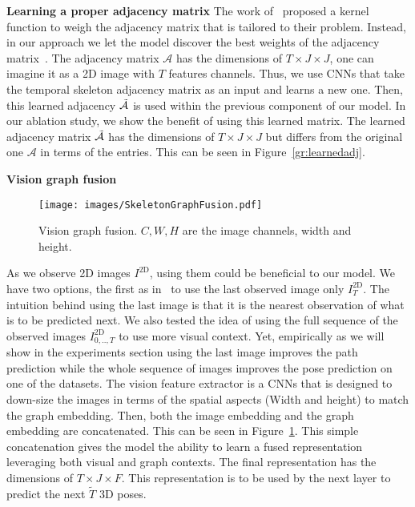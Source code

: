\documentclass[10pt,twocolumn,letterpaper]{article}
\begin{document}
\textbf{Learning a proper adjacency matrix}
The work of~\cite{mohamed2020social} proposed a kernel function to weigh the adjacency matrix that is tailored to their problem. Instead, in our approach we let the model discover the best weights of the adjacency matrix~\cite{wei2019motion}. The adjacency matrix $\mathcal{A}$ has the dimensions of $T \times J \times J$, one can imagine it as a 2D image with $T$ features channels. Thus, we use CNNs that take the temporal skeleton adjacency matrix as an input and learns a new one. Then, this learned adjacency $\mathcal{\Tilde{A}}$ is used within the previous component of our model. In our ablation study, we show the benefit of using this learned matrix. The learned adjacency matrix $\mathcal{\Tilde{A}}$ has the dimensions of $T \times J \times J$ but differs from the original one $\mathcal{A}$ in terms of the entries. This can be seen in Figure~\ref{gr:learnedadj}.

\textbf{Vision graph fusion}
\begin{figure}[t]
\begin{center}
\texttt{[image: images/SkeletonGraphFusion.pdf]}
\end{center}
   \caption{Vision graph fusion. $C, W, H$ are the image channels, width and height. }
\label{gr:fusion}
\end{figure}
As we observe 2D images $I^\text{2D}$, using them could be beneficial to our model. We have two options, the first as in~\cite{cao2020long} to use the last observed image only $I^\text{2D}_{T}$. The intuition behind using the last image is that it is the nearest observation of what is to be predicted next. We also tested the idea of using the full sequence of the observed images $I^\text{2D}_{0,..,T}$ to use more visual context. Yet, empirically as we will show in the experiments section using the last image improves the path prediction while the whole sequence of images improves the pose prediction on one of the datasets. The vision feature extractor is a CNNs that is designed to down-size the images in terms of the spatial aspects (Width and height) to match the graph embedding. Then, both the image embedding and the graph embedding are concatenated. This can be seen in Figure~\ref{gr:fusion}. This simple concatenation gives the model the ability to learn a fused representation leveraging both visual and graph contexts. The final representation has the dimensions of $T\times J \times F$. This representation is to be used by the next layer to predict the next $\tilde{T}$ 3D poses.
\end{document}
